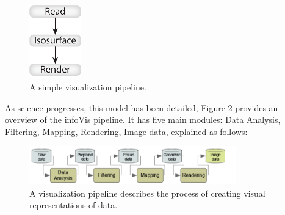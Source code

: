\begin{figure}[h!]
  \center
  \includegraphics[width=0.20\textwidth]{images/chapter2/simplepipline.PNG}
  \caption{A simple visualization pipeline.}
  \label{fig:simplepipeline}
\end{figure}

\bigbreak
As science progresses, this model has been detailed, Figure \ref{fig:infovispipeline} provides an overview of the infoVis pipeline. It has five main modules: Data Analysis, Filtering, Mapping, Rendering, Image data, explained as follows:


\begin{figure}[h!]
  \center
  \includegraphics[width=0.80\textwidth]{images/chapter2/infoVispipeline.PNG}
  \caption{A visualization pipeline describes the process of creating visual representations of data.}
  \label{fig:infovispipeline}
\end{figure}


